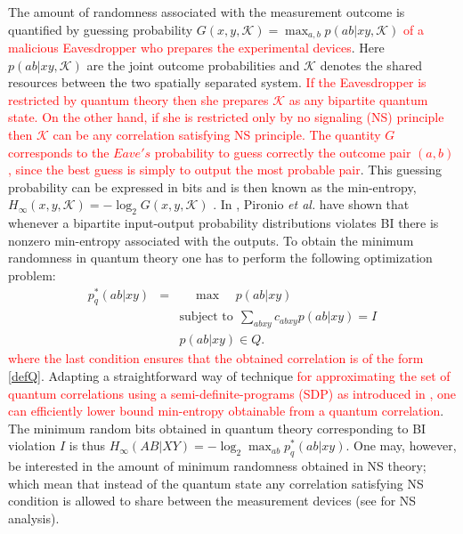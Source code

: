 \documentclass[doublecol,linenumbers]{epl2} %
\begin{document}
The amount of randomness associated with the measurement outcome is quantified by guessing probability $G(x,y,\mathcal{K})= \max_{a,b}p(ab|xy,\mathcal{K})$ \cite{Acin_2} \textcolor{red}{of a malicious Eavesdropper who prepares the experimental devices}. Here $p(ab|xy,\mathcal{K})$ are the joint outcome probabilities and $\mathcal{K}$ denotes the shared resources between the two spatially separated system. \textcolor{red}{If the Eavesdropper is restricted by quantum theory then she prepares $\mathcal{K}$ as any bipartite quantum state. On the other hand, if she is restricted only by no signaling (NS) principle then $\mathcal{K}$ can be any correlation satisfying NS principle. The quantity $G$ corresponds to the $Eave's$ probability to guess correctly the outcome pair $(a,b)$, since the best guess is simply to output the most probable pair}. This guessing probability can be expressed in bits and is then known as the min-entropy, $H_{\infty}(x,y,\mathcal{K})=-\log_2G(x,y,\mathcal{K})$ \cite{Koenig}. In \cite{Pironio_2}, Pironio \emph{et al.} have shown that whenever a bipartite input-output probability distributions violates BI there is nonzero min-entropy associated with the outputs. To obtain the minimum randomness in quantum theory one has to perform the following optimization problem: 
\begin{eqnarray}\label{rand_quantum}
p^*_q(ab|xy)&=&~~~~~~\mbox{max}~~~~~~p(ab|xy)\nonumber\\
&&\mbox{subject~to}~~\sum_{abxy}c_{abxy}p(ab|xy)=I\nonumber\\
&& p(ab|xy)\in Q.
\end{eqnarray}
\textcolor{red}{where the last condition ensures that the obtained correlation is of the form \ref{defQ}}. Adapting a straightforward way of technique \textcolor{red}{ for approximating the set of quantum correlations using a semi-definite-programs (SDP) as introduced in \cite{Navascues}, one can efficiently lower bound min-entropy obtainable from a quantum correlation}. The minimum random bits obtained in quantum theory corresponding to BI violation $I$ is thus $H_\infty(AB|XY)=-\log_2\max_{ab}p_q^*(ab|xy)$. One may, however, be interested in the amount of minimum randomness obtained in NS theory; which mean that instead of the quantum state any correlation satisfying NS condition is allowed to share between the measurement devices (see \cite{Pironio_2} for NS analysis). 
\end{document}
